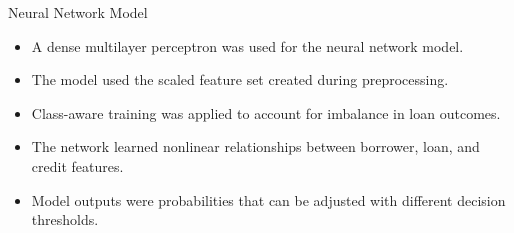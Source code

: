 \begin{frame}{Neural Network Model}
    \begin{itemize}
        \item A dense multilayer perceptron was used for the neural network model.
        \item The model used the scaled feature set created during preprocessing.
        \item Class-aware training was applied to account for imbalance in loan outcomes.
        \item The network learned nonlinear relationships between borrower, loan, and credit features.
        \item Model outputs were probabilities that can be adjusted with different decision thresholds.
    \end{itemize}
\end{frame}
